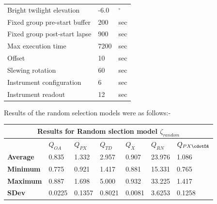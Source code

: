 \begin{landscape}
\begin{table}
\begin{center}
{\begin{tabular}{lll}
Bright twilight elevation & -6.0  & $^{\circ}$\\
Fixed group pre-start buffer & 200 & sec\\
Fixed group post-start lapse & 900 & sec\\
Max execution time & 7200 & sec\\
Offset & 10 & sec\\
Slewing rotation & 60 & sec \\
Instrument configuration & 6 &sec \\
Instrument readout & 12 & sec\\
\bottomrule
\end{tabular}
}
\end{center}
\end{table}
\end{landscape}

Results of the random selection models were as follows:-

\begin{table}
\begin{center}
\begin{tabular}{lllllll}
\toprule
\multicolumn{7}{c}{Results for Random slection model $\zeta_{random}$} \\
\midrule
 & $Q_{OA}$ & $Q_{PX}$ & $Q_{TD}$ & $Q_{X}$ & $Q_{RN}$ & $Q_{PX\cdotOA}$\\ 
\midrule
{\bf Average} & 0.835  & 1.332  & 2.957  & 0.907  & 23.976 & 1.086\\
{\bf Minimum} & 0.775  & 0.921  & 1.417  & 0.881  & 15.331 & 0.765\\
{\bf Maximum} & 0.887  & 1.698  & 5.000  & 0.932  & 33.225 & 1.417\\
{\bf SDev}    & 0.0225 & 0.1357 & 0.8021 & 0.0081 & 3.6253 & 0.1258\\
\bottomrule
\end{tabular}
\end{center}
\end{table}

